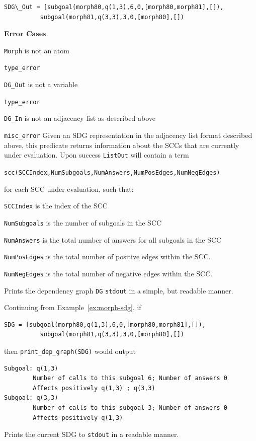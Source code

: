 \begin{description}
\begin{example}
\begin{verbatim}
SDG\_Out = [subgoal(morph80,q(1,3),6,0,[morph80,morph81],[]),
          subgoal(morph81,q(3,3),3,0,[morph80],[])
\end{verbatim}
\end{example}

{\bf Error Cases} 
\bi
\item 	{\tt Morph} is not an atom
\bi
\item 	{\tt type\_error}
\ei
%
\item 	{\tt DG\_Out} is not a variable
\bi
\item 	{\tt type\_error}
\ei
%
\item 	{\tt DG\_In} is not an adjacency list as described above
\bi
\item 	{\tt misc\_error}
\ei
\ei
%
%
Given an SDG representation in the adjacency list format described
above, this predicate returns information about the SCCs that are
currently under evaluation.  Upon success {\tt ListOut} will contain a
term

{\tt scc(SCCIndex,NumSubgoals,NumAnswers,NumPosEdges,NumNegEdges)}

for each SCC under evaluation, such that:

\bi
\item {\tt SCCIndex} is the index of the SCC
\item {\tt NumSubgoals} is the number of subgoals in the SCC
\item {\tt NumAnswers} is the total number of answers for all subgoals in the SCC
\item {\tt NumPosEdges} is the total number of positive edges within the SCC.
\item {\tt NumNegEdges} is the total number of negative edges within the SCC.
  \ei

%
Prints the dependency graph {\tt DG} {\tt stdout} in a simple, but
readable manner.
%
\begin{example}
Continuing from Example~\ref{ex:morph-sdg}, if 

\begin{verbatim}
SDG = [subgoal(morph80,q(1,3),6,0,[morph80,morph81],[]),
          subgoal(morph81,q(3,3),3,0,[morph80],[])
\end{verbatim}

then {\tt print\_dep\_graph(SDG)} would output

\begin{verbatim}
Subgoal: q(1,3)
        Number of calls to this subgoal 6; Number of answers 0
        Affects positively q(1,3) ; q(3,3)
Subgoal: q(3,3)
        Number of calls to this subgoal 3; Number of answers 0
        Affects positively q(1,3) 
\end{verbatim}
\end{example}

%
Prints the current SDG to {\tt stdout} in a readable manner.

\end{description}

